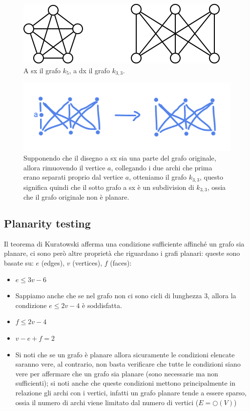 \documentclass[12pt,a4paper]{article}
\begin{document}
\begin{figure}[h]
	\centering
	\includegraphics[width=0.8\linewidth]{img/k33andk5.png}
	\caption{A sx il grafo $k_5$, a dx il grafo $k_{3,3}$.}
	\label{fig:graphk5,k33}
\end{figure}

\begin{figure}[h]
	\centering
	\includegraphics[width=0.8\linewidth]{img/subdivision}
	\caption{Supponendo che il disegno a sx sia una parte del grafo originale, allora rimuovendo il vertice $a$, collegando i due archi che prima erano separati proprio dal vertice $a$, otteniamo il grafo $k_{3,3}$, questo significa quindi che il sotto grafo a sx è un subdivision di $k_{3,3}$, ossia che il grafo originale non è planare.}
	\label{fig:graphk5,k33}
\end{figure}

\subsection{Planarity testing}
Il teorema di Kuratowski  afferma una condizione sufficiente affinché un grafo sia planare, ci sono però altre proprietà che riguardano i grafi planari: queste sono basate su: $e$ (edges), $v$ (vertices), $f$ (faces):
\begin{itemize}
\item $e \leq 3v - 6$
\item Sappiamo anche che se nel grafo non ci sono cicli di lunghezza $3$, allora la condizione $e \leq 2v - 4$ è soddisfatta.
\item $f \leq 2v - 4$
\item $v - e + f = 2$
\item Si noti che se un grafo è planare allora sicuramente le condizioni elencate saranno vere, al contrario, non basta verificare che tutte le condizioni siano vere per affermare che un grafo sia planare (sono necessarie ma non sufficienti); si noti anche che queste condizioni mettono principalmente in relazione gli archi con i vertici, infatti un grafo planare tende a essere sparso, ossia il numero di archi viene limitato dal numero di vertici ($E = \bigcirc (V)$)
\end{itemize}
\end{document}
